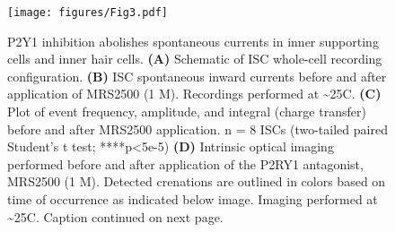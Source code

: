 \documentclass[9pt,lineno]{elife}
\begin{document}
\begin{figure}
\begin{fullwidth}
\begin{center}
\texttt{[image: figures/Fig3.pdf]}
\end{center}
\caption{P2Y1 inhibition abolishes spontaneous currents in inner supporting cells and inner hair cells.
\textbf{(A)} Schematic of ISC whole-cell recording configuration.
\textbf{(B)} ISC spontaneous inward currents before and after application of MRS2500 (1 \textmu M). Recordings performed at \textasciitilde 25\textdegree C.
\textbf{(C)} Plot of event frequency, amplitude, and integral (charge transfer) before and after MRS2500 application. n = 8 ISCs (two-tailed paired Student’s t test; ****p<5e-5)
\textbf{(D)} Intrinsic optical imaging performed before and after application of the P2RY1 antagonist, MRS2500 (1 \textmu M). Detected crenations are outlined in colors based on time of occurrence as indicated below image. Imaging performed at \textasciitilde 25\textdegree C. Caption continued on next page.
}
\label{fig:f3}
\end{fullwidth}
\end{figure}
\addtocounter{figure}{-1}
\end{document}
